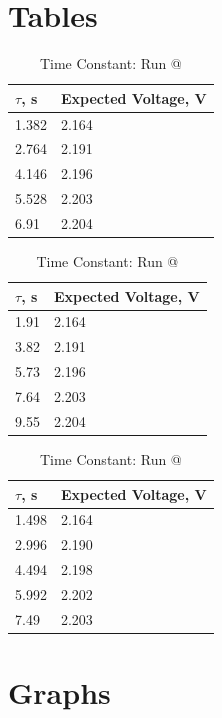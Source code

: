 \documentclass[a4,11pt]{article}
\makeatletter
\newcommand*{\rom}[1]{\expandafter\@slowromancap\romannumeral #1@}
\makeatother
\begin{document}
\section{Tables}
\begin{table}[H]
	\centering
	\caption{Time Constant: Run \rom{1}}
	\label{const1}
	\begin{tabular}{l|l}
		$\tau$, s  &  Expected Voltage, V \\
		\hline
		1.382 &  2.164 \\
		2.764 &  2.191 \\
		4.146 & 2.196 \\
		5.528 & 2.203 \\
		6.91 & 2.204 \\
	\end{tabular}
\end{table}
\begin{table}[H]
	\centering
	\caption{Time Constant: Run \rom{2}}
	\label{const2}
	\begin{tabular}{l|l}
		$\tau$, s  &  Expected Voltage, V \\
		\hline
		1.91 &  2.164 \\
		3.82 &  2.191 \\
		5.73 & 2.196 \\
		7.64 & 2.203 \\
		9.55 & 2.204 \\
	\end{tabular}
\end{table}
\begin{table}[H]
	\centering
	\caption{Time Constant: Run \rom{3}}
	\label{const3}
	\begin{tabular}{l|l}
		$\tau$, s  &  Expected Voltage, V \\
		\hline
		1.498 &  2.164 \\
		2.996 &  2.190 \\
		4.494 & 2.198 \\
		5.992 & 2.202 \\
		7.49 & 2.203 \\
	\end{tabular}
\end{table}
\section{Graphs}
\end{document}
